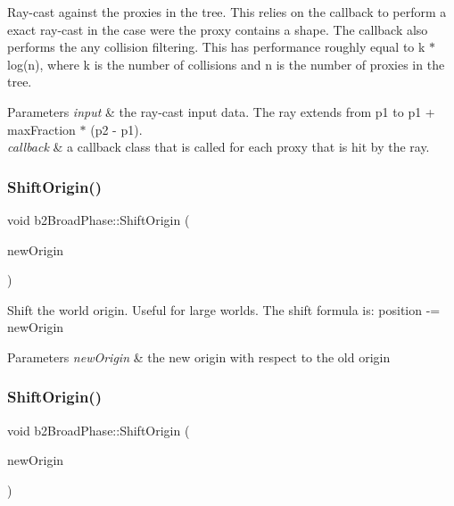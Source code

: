 Ray-\/cast against the proxies in the tree. This relies on the callback to perform a exact ray-\/cast in the case were the proxy contains a shape. The callback also performs the any collision filtering. This has performance roughly equal to k $\ast$ log(n), where k is the number of collisions and n is the number of proxies in the tree. 
\begin{DoxyParams}{Parameters}
{\em input} & the ray-\/cast input data. The ray extends from p1 to p1 + max\+Fraction $\ast$ (p2 -\/ p1). \\
\hline
{\em callback} & a callback class that is called for each proxy that is hit by the ray. \\
\hline
\end{DoxyParams}
\mbox{\label{classb2BroadPhase_a410e6115e3d1b4fca61cfbf397767772}} 
\subsubsection{\texorpdfstring{Shift\+Origin()}{ShiftOrigin()}\hspace{0.1cm}{\footnotesize\ttfamily [1/2]}}
{\footnotesize\ttfamily void b2\+Broad\+Phase\+::\+Shift\+Origin (\begin{DoxyParamCaption}\item[{const \hyperlink{structb2Vec2}{b2\+Vec2} \&}]{new\+Origin }\end{DoxyParamCaption})\hspace{0.3cm}{\ttfamily [inline]}}

Shift the world origin. Useful for large worlds. The shift formula is\+: position -\/= new\+Origin 
\begin{DoxyParams}{Parameters}
{\em new\+Origin} & the new origin with respect to the old origin \\
\hline
\end{DoxyParams}
\mbox{\label{classb2BroadPhase_a410e6115e3d1b4fca61cfbf397767772}} 
\subsubsection{\texorpdfstring{Shift\+Origin()}{ShiftOrigin()}\hspace{0.1cm}{\footnotesize\ttfamily [2/2]}}
{\footnotesize\ttfamily void b2\+Broad\+Phase\+::\+Shift\+Origin (\begin{DoxyParamCaption}\item[{const \hyperlink{structb2Vec2}{b2\+Vec2} \&}]{new\+Origin }\end{DoxyParamCaption})}


